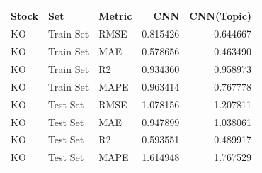 \begin{tabular}{lllrr}
\toprule
Stock & Set & Metric & CNN & CNN(Topic) \\
\midrule
KO & Train Set & RMSE & 0.815426 & 0.644667 \\
KO & Train Set & MAE & 0.578656 & 0.463490 \\
KO & Train Set & R2 & 0.934360 & 0.958973 \\
KO & Train Set & MAPE & 0.963414 & 0.767778 \\
KO & Test Set & RMSE & 1.078156 & 1.207811 \\
KO & Test Set & MAE & 0.947899 & 1.038061 \\
KO & Test Set & R2 & 0.593551 & 0.489917 \\
KO & Test Set & MAPE & 1.614948 & 1.767529 \\
\bottomrule
\end{tabular}
